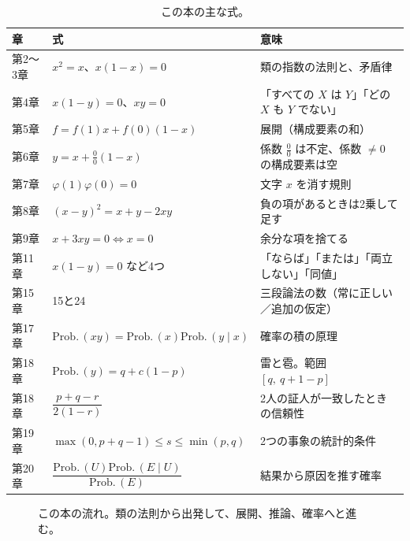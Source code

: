 \documentclass[a4paper,11pt,openany]{ltjsbook}
\newcommand{\Prob}{\mathrm{Prob.}\,}
\begin{document}
\begin{table}[htbp]
\centering
\small
\begin{tabular}{llp{5.6cm}}
\toprule
章 & 式 & 意味\\
\midrule
第2〜3章 & $x^2=x$、$x(1-x)=0$ & 類の指数の法則と、矛盾律\\
第4章 & $x(1-y)=0$、$xy=0$ & 「すべての $X$ は $Y$」「どの $X$ も $Y$ でない」\\
第5章 & $f=f(1)x+f(0)(1-x)$ & 展開（構成要素の和）\\
第6章 & $y=x+\tfrac00(1-x)$ & 係数 $\tfrac00$ は不定、係数 $\ne0$ の構成要素は空\\
第7章 & $\varphi(1)\varphi(0)=0$ & 文字 $x$ を消す規則\\
第8章 & $(x-y)^2=x+y-2xy$ & 負の項があるときは2乗して足す\\
第9章 & $x+3xy=0\iff x=0$ & 余分な項を捨てる\\
第11章 & $x(1-y)=0$ など4つ & 「ならば」「または」「両立しない」「同値」\\
第15章 & 15と24 & 三段論法の数（常に正しい／追加の仮定）\\
第17章 & $\Prob(xy)=\Prob(x)\Prob(y\mid x)$ & 確率の積の原理\\
第18章 & $\Prob(y)=q+c(1-p)$ & 雷と雹。範囲 $[q,\ q+1-p]$\\
第18章 & $\dfrac{p+q-r}{2(1-r)}$ & 2人の証人が一致したときの信頼性\\
第19章 & $\max(0,p+q-1)\le s\le\min(p,q)$ & 2つの事象の統計的条件\\
第20章 & $\dfrac{\Prob(U)\Prob(E\mid U)}{\Prob(E)}$ & 結果から原因を推す確率\\
\bottomrule
\end{tabular}
\caption{この本の主な式。}
\end{table}

\begin{figure}[htbp]
\centering
{}
\caption{この本の流れ。類の法則から出発して、展開、推論、確率へと進む。}
\end{figure}
\end{document}
